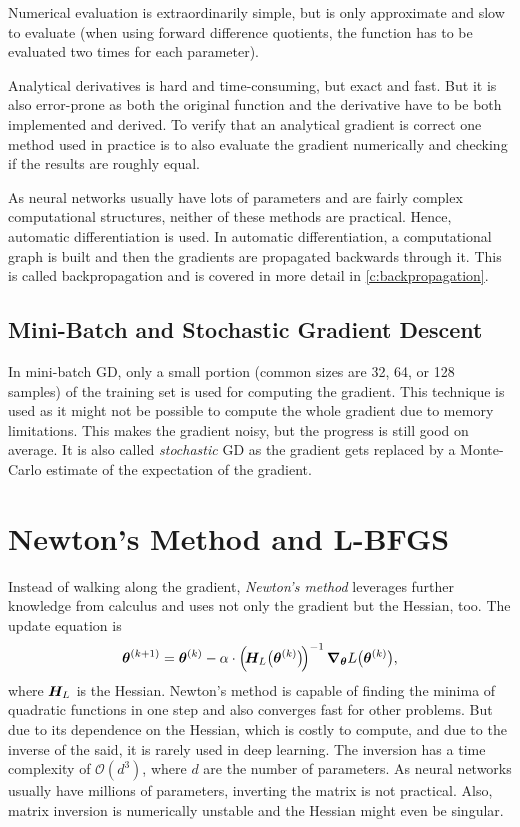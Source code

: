 			Numerical evaluation is extraordinarily simple, but is only approximate and slow to evaluate (when using forward difference quotients, the function has to be evaluated two times for each parameter).

			Analytical derivatives is hard and time-consuming, but exact and fast. But it is also error-prone as both the original function and the derivative have to be both implemented and derived. To verify that an analytical gradient is correct one method used in practice is to also evaluate the gradient numerically and checking if the results are roughly equal.

			As neural networks usually have lots of parameters and are fairly complex computational structures, neither of these methods are practical. Hence, automatic differentiation is used. In automatic differentiation, a computational graph is built and then the gradients are propagated backwards through it. This is called backpropagation and is covered in more detail in \autoref{c:backpropagation}.

		\subsection{Mini-Batch and Stochastic Gradient Descent}
			In mini-batch GD, only a small portion (common sizes are \num{32}, \num{64}, or \num{128} samples) of the training set is used for computing the gradient. This technique is used as it might not be possible to compute the whole gradient due to memory limitations. This makes the gradient noisy, but the progress is still good on average. It is also called \emph{stochastic} GD as the gradient gets replaced by a Monte-Carlo estimate of the expectation of the gradient.

	\section{Newton's Method and L-BFGS}
		Instead of walking along the gradient, \emph{Newton's method} leverages further knowledge from calculus and uses not only the gradient but the Hessian, too. The update equation is
		\begin{equation}
			\bm{\theta}^{(k + 1)} = \bm{\theta}^{(k)} - \alpha \cdot \Bigl(\!\bm{H}_L\bigl( \bm{\theta}^{(k)} \bigr)\!\Bigr)^{-1} \, \grad_{\bm{\theta}} L\bigl( \bm{\theta}^{(k)} \bigr),
		\end{equation}
		where \(\bm{H}_L\) is the Hessian. Newton's method is capable of finding the minima of quadratic functions in one step and also converges fast for other problems. But due to its dependence on the Hessian, which is costly to compute, and due to the inverse of the said, it is rarely used in deep learning. The inversion has a time complexity of \( \mathcal{O}(d^3) \), where \(d\) are the number of parameters. As neural networks usually have millions of parameters, inverting the matrix is not practical. Also, matrix inversion is numerically unstable and the Hessian might even be singular.

